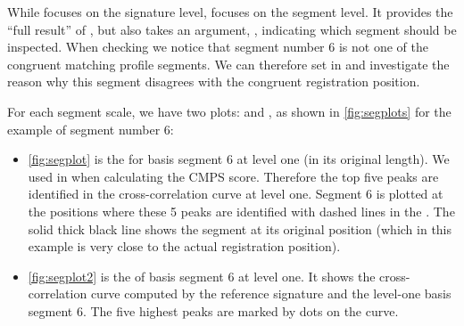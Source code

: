 While  focuses on the signature level,
 focuses on the segment level. It provides
the ``full result'' of , but also takes
an argument, , indicating which segment should be
inspected. When checking  we notice that
segment number 6 is not one of the congruent matching profile segments.
We can therefore set  in 
and investigate the reason why this segment disagrees with the congruent
registration position.

For each segment scale, we have two plots:  and
, as shown in \autoref{fig:segplots} for the
example of segment number 6:

\begin{itemize}
\tightlist
\item
  \autoref{fig:segplot} is the  for basis segment 6
  at level one (in its original length). We used
   in  when
  calculating the CMPS score. Therefore the top five peaks are
  identified in the cross-correlation curve at level one. Segment 6 is
  plotted at the positions where these 5 peaks are identified with
  dashed lines in the . The solid thick black line
  shows the segment at its original position (which in this example is
  very close to the actual registration position).
\item
  \autoref{fig:segplot2} is the  of basis segment
  6 at level one. It shows the cross-correlation curve computed by the
  reference signature and the level-one basis segment 6. The five
  highest peaks are marked by dots on the curve.
\end{itemize}

